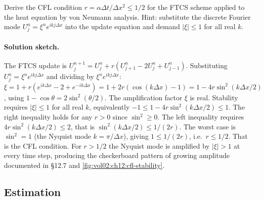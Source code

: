 \begin{exercise}
Derive the CFL condition $r = \alpha \Delta t/\Delta x^{2} \leq
1/2$ for the FTCS scheme applied to the heat equation by von
Neumann analysis. Hint: substitute the discrete Fourier mode
$U_{j}^{n} = \xi^{n} e^{i k j \Delta x}$ into the update equation
and demand $|\xi| \leq 1$ for all real $k$.

\paragraph{Solution sketch.}
The FTCS update is $U_{j}^{n+1} = U_{j}^{n} + r(U_{j+1}^{n} -
2 U_{j}^{n} + U_{j-1}^{n})$. Substituting $U_{j}^{n} = \xi^{n}
e^{i k j \Delta x}$ and dividing by $\xi^{n} e^{i k j \Delta x}$:
$\xi = 1 + r(e^{i k \Delta x} - 2 + e^{-i k \Delta x}) = 1 +
2 r(\cos(k \Delta x) - 1) = 1 - 4 r \sin^{2}(k \Delta x / 2)$,
using $1 - \cos\theta = 2 \sin^{2}(\theta/2)$. The amplification
factor $\xi$ is real. Stability requires $|\xi| \leq 1$ for all
real $k$, equivalently $-1 \leq 1 - 4 r \sin^{2}(k \Delta x / 2)
\leq 1$. The right inequality holds for any $r > 0$ since
$\sin^{2} \geq 0$. The left inequality requires $4 r \sin^{2}
(k\Delta x/2) \leq 2$, that is $\sin^{2}(k\Delta x/2) \leq
1/(2 r)$. The worst case is $\sin^{2} = 1$ (the Nyquist mode
$k = \pi/\Delta x$), giving $1 \leq 1/(2 r)$, i.e.\ $r \leq 1/2$.
That is the CFL condition. For $r > 1/2$ the Nyquist mode is
amplified by $|\xi| > 1$ at every time step, producing the
checkerboard pattern of growing amplitude documented in §12.7
and \cref{fig:vol02:ch12:cfl-stability}.
\end{exercise}

\subsection*{Estimation}

